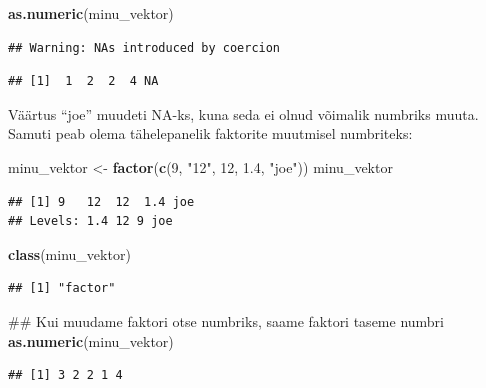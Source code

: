 \documentclass[]{book}
\newenvironment{Shaded}{\begin{snugshade}}{\end{snugshade}}
\newcommand{\KeywordTok}[1]{\textcolor[rgb]{0.13,0.29,0.53}{\textbf{#1}}}
\newcommand{\DecValTok}[1]{\textcolor[rgb]{0.00,0.00,0.81}{#1}}
\newcommand{\FloatTok}[1]{\textcolor[rgb]{0.00,0.00,0.81}{#1}}
\newcommand{\StringTok}[1]{\textcolor[rgb]{0.31,0.60,0.02}{#1}}
\newcommand{\NormalTok}[1]{#1}
\begin{document}
\begin{Shaded}
\begin{Highlighting}[]
\KeywordTok{as.numeric}\NormalTok{(minu_vektor)}
\end{Highlighting}
\end{Shaded}

\begin{verbatim}
## Warning: NAs introduced by coercion
\end{verbatim}

\begin{verbatim}
## [1]  1  2  2  4 NA
\end{verbatim}

Väärtus ``joe'' muudeti NA-ks, kuna seda ei olnud võimalik numbriks
muuta. Samuti peab olema tähelepanelik faktorite muutmisel numbriteks:

\begin{Shaded}
\begin{Highlighting}[]
\NormalTok{minu_vektor <-}\StringTok{ }\KeywordTok{factor}\NormalTok{(}\KeywordTok{c}\NormalTok{(}\DecValTok{9}\NormalTok{, }\StringTok{"12"}\NormalTok{, }\DecValTok{12}\NormalTok{, }\FloatTok{1.4}\NormalTok{, }\StringTok{"joe"}\NormalTok{))}
\NormalTok{minu_vektor}
\end{Highlighting}
\end{Shaded}

\begin{verbatim}
## [1] 9   12  12  1.4 joe
## Levels: 1.4 12 9 joe
\end{verbatim}

\begin{Shaded}
\begin{Highlighting}[]
\KeywordTok{class}\NormalTok{(minu_vektor)}
\end{Highlighting}
\end{Shaded}

\begin{verbatim}
## [1] "factor"
\end{verbatim}

\begin{Shaded}
\begin{Highlighting}[]
\NormalTok{## Kui muudame faktori otse numbriks, saame faktori taseme numbri}
\KeywordTok{as.numeric}\NormalTok{(minu_vektor)}
\end{Highlighting}
\end{Shaded}

\begin{verbatim}
## [1] 3 2 2 1 4
\end{verbatim}
\end{document}
